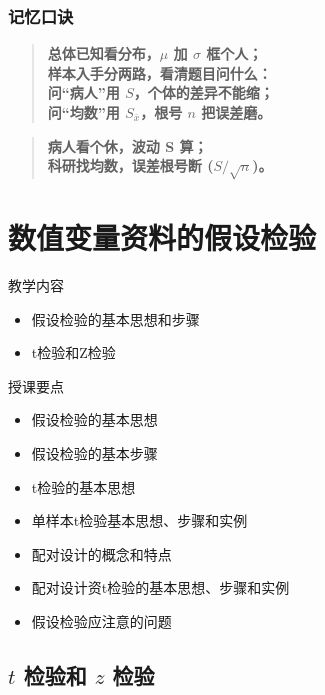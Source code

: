 \documentclass[lang=cn,10pt]{elegantbook}
\begin{document}
\subsection{记忆口诀}

\begin{quote}
    \textbf{总体已知看分布，$\mu$ 加 $\sigma$ 框个人；}\\
    \textbf{样本入手分两路，看清题目问什么：}\\
    \textbf{问“病人”用 $S$，个体的差异不能缩；}\\
    \textbf{问“均数”用 $S_{\bar{x}}$，根号 $n$ 把误差磨。}
\end{quote}

\begin{quote}
    \textbf{病人看个休，波动 S 算；}\\
    \textbf{科研找均数，误差根号断 ($S/\sqrt{n}$)。}
\end{quote}


\chapter{数值变量资料的假设检验}

\begin{introduction}
    \item 教学内容
    \begin{itemize}
        \item 假设检验的基本思想和步骤
        \item t检验和Z检验
    \end{itemize}
    \item 授课要点
    \begin{itemize}
        \item 假设检验的基本思想
        \item 假设检验的基本步骤
        \item t检验的基本思想
        \item 单样本t检验基本思想、步骤和实例
        \item 配对设计的概念和特点
        \item 配对设计资t检验的基本思想、步骤和实例
        \item 假设检验应注意的问题

    \end{itemize}
\end{introduction}


\section{$t$ 检验和 $z$ 检验}
\end{document}
